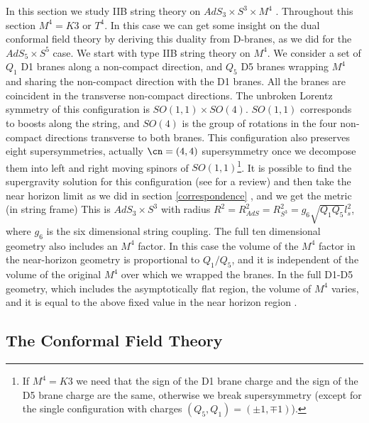 In this section we study IIB string theory on
 $AdS_3 \times S^3 \times M^4$ \cite{Maldacena:1998bw,deBoer:1998ip}. 
Throughout this section 
 $M^4 = K3$ or $ T^4$. 
In this case we can get some insight on the dual conformal 
field theory  by deriving this duality from D-branes, as we did
for the $AdS_5 \times S^5 $ case. 
We start with type IIB string theory on $M^4$. 
We consider a set of  $Q_1$ D1 branes along a non-compact direction,
and $Q_5$ D5 branes wrapping $M^4$ and sharing the non-compact direction
with the D1 branes. All the branes are coincident in the transverse
non-compact directions. 
The unbroken Lorentz symmetry of this configuration is  $SO(1,1)\times
SO(4)$. $SO(1,1)$ corresponds to boosts along the string, and
$SO(4)$ is the group of rotations in the four non-compact directions
transverse to both branes.
This configuration also  preserves eight supersymmetries, actually
$\cn=(4,4)$
supersymmetry once we decompose them into left and right moving
spinors of $SO(1,1)$\footnote{
If $M^4 = K3$ we need that the sign of the D1 brane charge and the
sign of the D5 brane charge are the same, otherwise we break supersymmetry
(except for the single configuration with charges $(Q_5, Q_1) =
 ( \pm 1 , \mp 1)$).}.
It is possible to find the supergravity solution for this configuration
(see \cite{Youm:1997hw} for a review)
and then  take the near horizon limit as we did in section
\ref{correspondence}
\cite{Maldacena:1997re},
and we get the metric (in string frame)
This is  $AdS_3 \times S^3$ with radius 
$R^2 = R_{AdS}^2 = R_{S^3}^2 = g_6 \sqrt{Q_1 Q_5} l_s^2$, where $g_6$ is
the six dimensional string coupling. The full ten dimensional 
geometry also includes an $M^4$ factor. In this case the volume  of 
the $M^4$  factor in the near-horizon geometry
is proportional to $ Q_1/ Q_5 $, and it is independent
of the volume of the original $M^4$ over which we wrapped the branes.
In the full D1-D5 geometry, which includes the asymptotically flat
region, the volume of $M^4$ varies, and it is equal to the above fixed value
in the near horizon region 
\cite{Andrianopoli:1996ve,Ferrara:1995ih,Ferrara:1996dd,Ferrara:1996um}. 



\subsection{The Conformal Field Theory}

